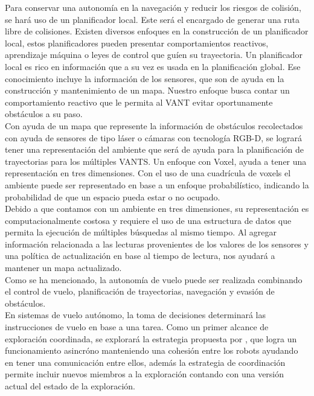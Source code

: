 \documentclass[sigconf]{acmart}
\begin{document}
Para conservar una autonomía en la navegación y reducir los riesgos de colisión, se hará uso de un planificador local. Este será el encargado de generar una ruta libre de colisiones. Existen diversos enfoques en la construcción de un planificador local, estos planificadores pueden presentar comportamientos reactivos, aprendizaje máquina o leyes de control que guíen su trayectoria. Un planificador local es rico en información que a su vez es usada en la planificación global. Ese conocimiento incluye la información de los sensores, que son de ayuda en la construcción y mantenimiento de un mapa. Nuestro enfoque busca contar un comportamiento reactivo que le permita al VANT evitar oportunamente obstáculos a su paso.\\

Con ayuda de un mapa que represente la información de obstáculos recolectados con ayuda de sensores de tipo láser o cámaras con tecnología RGB-D, se logrará tener una representación del ambiente que será de ayuda para la planificación de trayectorias para los múltiples VANTS. Un enfoque con Voxel, ayuda a tener una representación en tres dimensiones. Con el uso de una cuadrícula de voxels el ambiente puede ser representado en base a un enfoque probabilístico, indicando la probabilidad de que un espacio pueda estar o no ocupado.\\

Debido a que contamos con un ambiente en tres dimensiones, su representación es computacionalmente costosa y requiere el uso de una estructura de datos que permita la ejecución de múltiples búsquedas al mismo tiempo. Al agregar información relacionada a las lecturas provenientes de los valores de los sensores y una política de actualización en base al tiempo de lectura, nos ayudará a mantener un mapa actualizado.\\

Como se ha mencionado, la autonomía de vuelo puede ser realizada combinando el control de vuelo, planificación de trayectorias, navegación y evasión de obstáculos.\\

En sistemas de vuelo autónomo, la toma de decisiones determinará las instrucciones de vuelo en base a una tarea. Como un primer alcance de exploración coordinada, se explorará la estrategia propuesta por \citeauthor{CINVESTAM2013} \cite{CINVESTAM2013}, que logra un funcionamiento asincróno manteniendo una cohesión entre los robots ayudando en tener una comunicación entre ellos, además la estrategia de coordinación permite incluir nuevos miembros a la exploración contando con una versión actual del estado de la exploración.\\
\end{document}
